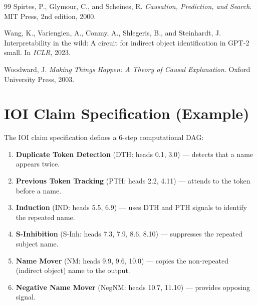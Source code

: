 \documentclass[10pt]{article}
\begin{document}
\begin{thebibliography}{99}
Spirtes, P., Glymour, C., and Scheines, R.
\newblock \emph{Causation, Prediction, and Search}.
\newblock MIT Press, 2nd edition, 2000.

Wang, K., Variengien, A., Conmy, A., Shlegeris, B., and Steinhardt, J.
\newblock Interpretability in the wild: A circuit for indirect object identification in {GPT}-2 small.
\newblock In \emph{ICLR}, 2023.

Woodward, J.
\newblock \emph{Making Things Happen: A Theory of Causal Explanation}.
\newblock Oxford University Press, 2003.

\end{thebibliography}

\appendix

\section{IOI Claim Specification (Example)}
\label{app:ioi-spec}

The IOI claim specification defines a 6-step computational DAG:

\begin{enumerate}[nosep]
    \item \textbf{Duplicate Token Detection} (DTH: heads 0.1, 3.0) --- detects that a name appears twice.
    \item \textbf{Previous Token Tracking} (PTH: heads 2.2, 4.11) --- attends to the token before a name.
    \item \textbf{Induction} (IND: heads 5.5, 6.9) --- uses DTH and PTH signals to identify the repeated name.
    \item \textbf{S-Inhibition} (S-Inh: heads 7.3, 7.9, 8.6, 8.10) --- suppresses the repeated subject name.
    \item \textbf{Name Mover} (NM: heads 9.9, 9.6, 10.0) --- copies the non-repeated (indirect object) name to the output.
    \item \textbf{Negative Name Mover} (NegNM: heads 10.7, 11.10) --- provides opposing signal.
\end{enumerate}
\end{document}
